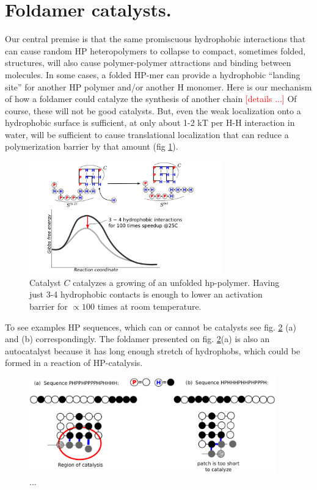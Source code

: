 \documentclass[12pt]{paper}
\newcommand{\red}[1]{\textcolor{red}{#1}}
\begin{document}
\section{Foldamer catalysts.}
Our central premise is that the same promiscuous hydrophobic interactions that can cause random 
HP heteropolymers to collapse to compact, sometimes folded, structures, will also cause 
polymer-polymer attractions and binding between molecules.  In some cases, a folded HP-mer can 
provide a hydrophobic ``landing site'' for another HP polymer and/or another H monomer.  Here is 
our mechanism of how a foldamer could catalyze the synthesis of another chain \red{[details ...]}  
Of course, these will not be good catalysts.  But, even the weak localization onto a hydrophobic 
surface is sufficient, at only about 1-2 kT per H-H interaction in water, will be sufficient to 
cause translational localization that can reduce a polymerization barrier by that amount (fig 
\ref{fig:assist-barrier}).
\begin{figure}[h!]
  \centering
  \includegraphics[width=0.75\textwidth]{pictures/assistance-with-barrier.png} 
  \caption{Catalyst $C$ catalyzes a growing of an unfolded hp-polymer. 
           Having just 3-4 hydrophobic contacts is enough to lower an 
           activation barrier for $\propto 100$ times at room 
           temperature.}\label{fig:assist-barrier}
\end{figure}

To see examples HP sequences, which can or cannot be catalysts see fig. \ref{fig:ex-fold-n-cat} 
(a) and (b) correspondingly. The foldamer presented on fig. \ref{fig:ex-fold-n-cat}(a) is also an 
autocatalyst because it has long enough stretch of hydrophobs, which could be formed in a reaction 
of HP-catalysis.
\begin{figure}[h!]
  \centering
  \includegraphics[width=0.95\textwidth]{pictures/example-fold-n-cat.pdf} 
  \caption{...}\label{fig:ex-fold-n-cat}
\end{figure}
\end{document}
